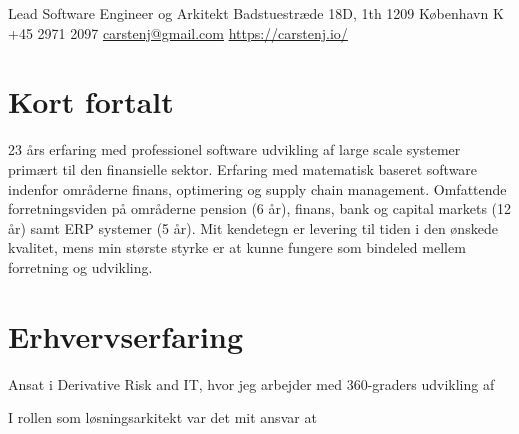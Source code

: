 \documentclass[10pt, a4paper]{article}
\begin{document}
{Lead Software Engineer og Arkitekt}
{Badstuestræde 18D, 1th}
{1209 København K}
{+45 2971 2097}
{\href{mailto:carstenj@gmail.com}{carstenj@gmail.com}}
{\href{https://carstenj.io/}{https://carstenj.io/}}
\section{Kort fortalt}
23 års erfaring med professionel software udvikling af large scale systemer primært til den finansielle sektor. Erfaring med matematisk baseret software indenfor områderne finans, optimering og supply chain management. Omfattende forretningsviden på områderne pension (6 år), finans, bank og capital markets (12 år) samt ERP systemer (5 år). Mit kendetegn er levering til tiden i den ønskede kvalitet, mens min største styrke er at kunne fungere som bindeled mellem forretning og udvikling.

\section{Erhvervserfaring}

{Ansat i Derivative Risk and IT, hvor jeg arbejder med 360-graders udvikling af}
{
}

{I rollen som løsningsarkitekt var det mit ansvar at}
{
}
\end{document}
